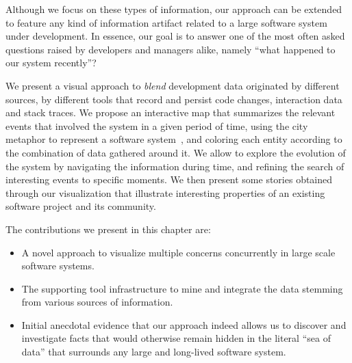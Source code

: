 Although we focus on these types of information, our approach can be extended to feature any kind of information artifact related to a large software system under development.
In essence, our goal is to answer one of the most often asked questions raised by developers and managers alike, namely ``what happened to our system recently''?~\cite{Sill2008}

We present a visual approach to \emph{blend} development data originated by different  sources, \eg by different tools that record and persist code changes, interaction data and stack traces.
We propose an interactive map that summarizes the relevant events that involved the system in a given period of time, using the city metaphor to represent a software system~\cite{Wett2007}, and coloring each entity according to the combination of data gathered around it.
We allow to explore the evolution of the system by navigating the information during time, and refining the search of interesting events to specific moments.
We then present some stories obtained through our visualization that illustrate interesting properties of an existing software project and its community.

The contributions we present in this chapter are:

\begin{itemize}

\item A novel approach to visualize multiple concerns concurrently in large scale software systems.

\item The supporting tool infrastructure to mine and integrate the data stemming from various sources of information.

\item Initial anecdotal evidence that our approach indeed allows us to discover and investigate facts that would otherwise remain hidden in the literal ``sea of data'' that surrounds any large and long-lived software system.

\end{itemize}


